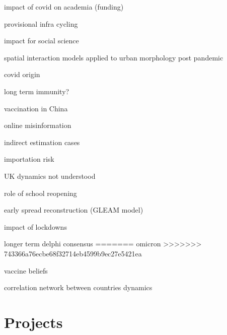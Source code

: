 \documentclass[10pt]{article}
\begin{document}
\cite{nature2021covid} impact of covid on academia (funding)

\cite{Krause2024399118} provisional infra cycling

\cite{Conleye2104155118} impact for social science

\cite{batty2021morphology} spatial interaction models applied to urban morphology post pandemic

\cite{maxmen2021covid} covid origin

\cite{radbruch2021long} long term immunity?

\cite{mallapaty2021china} vaccination in China

\cite{caldarelli2021flow} online misinformation

\cite{Ironse2103272118} indirect estimation cases

\cite{Hane2100201118} importation risk

\cite{ball2021surprise} UK dynamics not understood

\cite{Chernozhukove2103420118} role of school reopening

\cite{cauchemez2021reconstruction} early spread reconstruction (GLEAM model)

\cite{li2021emergence}

\cite{murcio2021impact} impact of lockdowns

\cite{lazarus2022multinational} longer term delphi consensus
=======
\cite{adam2022will} omicron
>>>>>>> 743366a76ecbe68f32714eb4599b9ec27e5421ea

\cite{doi:10.1073/pnas.2118721119} vaccine beliefs

\cite{https://doi.org/10.48550/arxiv.2206.03181} correlation network between countries dynamics

\section{Projects}
\end{document}
